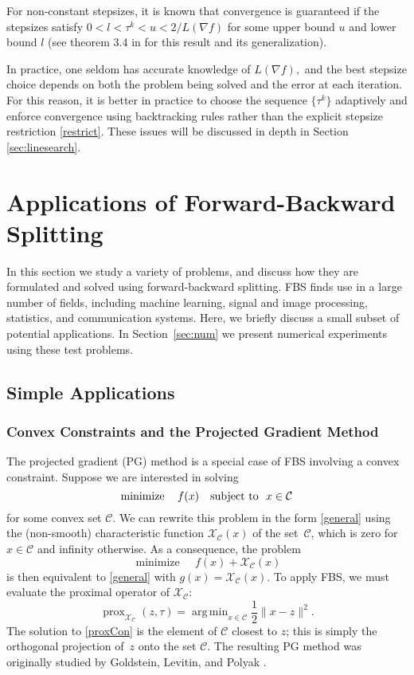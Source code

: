 \documentclass{amsart}
\newcommand{\half}{\frac{1}{2}}
\newcommand{\eqn}[2]{\begin{equation}\label{#1}#2\end{equation}}
\newcommand{\st}{\hbox{ \,\,subject to\,\, }}
\newcommand{\Chi}{\mathcal{X}}
\DeclareMathOperator*{\minimize}{minimize\quad}
\DeclareMathOperator*{\argmin}{arg\,min}
\DeclareMathOperator{\prox}{prox}
\theoremstyle{definition}
\begin{document}
        For non-constant stepsizes, it is known that convergence is guaranteed if the stepsizes satisfy $0<l<\tau^k<u<2/L(\nabla f)$ for some upper bound $u$ and  lower bound $l$  (see theorem 3.4 in \cite{CW05} for this result and its generalization).
    
    In practice, one seldom has accurate knowledge of $L(\nabla f),$ and the best stepsize choice depends on both the problem being solved and the error at each iteration.  For this reason, it is better in practice to choose the sequence $\{\tau^k\}$ adaptively and enforce convergence using backtracking rules rather than the explicit stepsize restriction \eqref{restrict}.  These issues will be discussed in depth in Section \ref{sec:linesearch}.
    
  





\section{Applications of Forward-Backward Splitting} \label{sec:apps}
In this section we study a variety of problems, and discuss how they are formulated and solved using forward-backward splitting.
FBS  finds use in a large number of fields, including machine learning, signal and image processing, statistics, and communication systems.  Here, we briefly discuss a small subset of potential applications.  In Section~\ref{sec:num} we present numerical experiments using these test problems.

\newpage
\subsection{Simple Applications}
\subsubsection{Convex Constraints and the Projected Gradient Method}  \label{sec:projGrad}
The projected gradient (PG) method is a special case of FBS involving a convex constraint.
Suppose we are interested in solving 
 \eqn{cons}{\minimize f(x) \,\, \st x\in \mathcal{C}}
 for some convex set $\mathcal{C}$.  We can rewrite this problem in the form \eqref{general} using the (non-smooth) characteristic function $\Chi_\mathcal{C}(x)$ of the set~$\mathcal{C}$, which is zero for $x\in \mathcal{C}$ and infinity otherwise.  As a consequence, the  problem
   $$\minimize f(x) +\Chi_\mathcal{C}(x)$$
is then equivalent to \eqref{general} with $g(x) = \Chi_\mathcal{C}(x)$.  To apply FBS, we must evaluate the proximal operator of $\Chi_\mathcal{C}$:  
 \eqn{proxCon}{
 \prox_{\Chi_\mathcal{C}}(z,\tau) = \argmin_{x\in \mathcal{C}}  \half \|x-z\|^2.
 } 
The solution to \eqref{proxCon} is the element of $\mathcal{C}$ closest to $z$; this is simply the orthogonal projection of~$z$ onto the set $\mathcal{C}$. 
The resulting PG method was originally studied by Goldstein, Levitin, and Polyak \cite{Bertsekas76,Goldstein64,LP66}.
\end{document}
